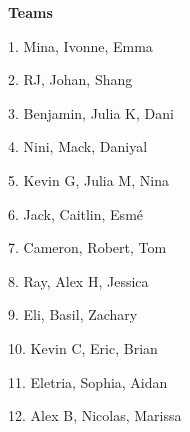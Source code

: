 \documentclass[12pt,letterpaper,noanswers]{exam}
\begin{document}
\noindent \textbf{Teams}
\begin{multicols}{3}
1. Mina, Ivonne, Emma

2.  RJ, Johan, Shang

3. Benjamin, Julia K, Dani

4. Nini, Mack, Daniyal

5. Kevin G, Julia M, Nina

6. Jack, Caitlin, Esmé

7. Cameron, Robert, Tom

8. Ray, Alex H, Jessica

9. Eli, Basil, Zachary

10.  Kevin C, Eric, Brian

11. Eletria, Sophia, Aidan

12. Alex B, Nicolas, Marissa

\end{multicols}
\end{document}
